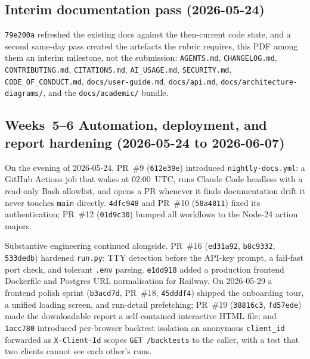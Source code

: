 \subsection*{Interim documentation pass (2026-05-24)}

\texttt{79e200a} refreshed the existing docs against the then-current code state,
and a second same-day pass created the artefacts the rubric requires, this PDF
among them \textemdash{} an interim milestone, not the submission:
\texttt{AGENTS.md}, \texttt{CHANGELOG.md}, \texttt{CONTRIBUTING.md},
\texttt{CITATIONS.md}, \texttt{AI\_USAGE.md}, \texttt{SECURITY.md},
\texttt{CODE\_OF\_CONDUCT.md}, \texttt{docs/user-guide.md}, \texttt{docs/api.md},
\texttt{docs/architecture-diagrams/}, and the \texttt{docs/academic/} bundle.

\subsection*{Weeks~5--6 \textemdash{} Automation, deployment, and report hardening (2026-05-24 to 2026-06-07)}

On the evening of 2026-05-24, PR~\#9 (\texttt{612e39e}) introduced
\texttt{nightly-docs.yml}: a GitHub Actions job that wakes at 02:00~UTC, runs
Claude Code headless with a read-only Bash allowlist, and opens a PR whenever it
finds documentation drift \textemdash{} it never touches \texttt{main} directly.
\texttt{4dfc948} and PR~\#10 (\texttt{58a4811}) fixed its authentication;
PR~\#12 (\texttt{01d9c30}) bumped all workflows to the Node-24 action majors.

Substantive engineering continued alongside. PR~\#16 (\texttt{ed31a92},
\texttt{b8c9332}, \texttt{533dedb}) hardened \texttt{run.py}: TTY detection
before the API-key prompt, a fail-fast port check, and tolerant \texttt{.env}
parsing. \texttt{e1dd918} added a production frontend Dockerfile and Postgres URL
normalisation for Railway. On 2026-05-29 a frontend polish sprint
(\texttt{b3acd7d}, PR~\#18, \texttt{45dddf4}) shipped the onboarding tour, a
unified loading screen, and run-detail prefetching; PR~\#19 (\texttt{38816c3},
\texttt{fd57ede}) made the downloadable report a self-contained interactive HTML
file; and \texttt{1acc780} introduced per-browser backtest isolation \textemdash{}
an anonymous \texttt{client\_id} forwarded as \texttt{X-Client-Id} scopes
\texttt{GET /backtests} to the caller, with a test that two clients cannot see
each other's runs.

